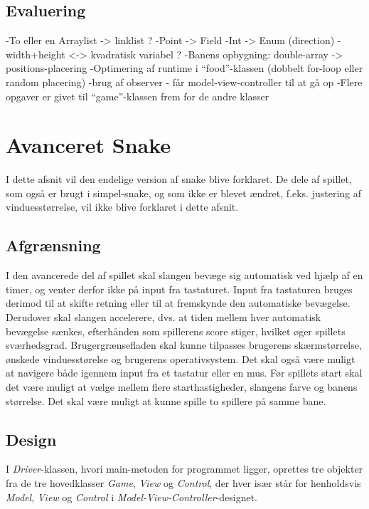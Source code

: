 \documentclass{report}
\begin{document}
\section{Evaluering}
-To eller en Arraylist -> linklist ?
-Point -> Field
-Int -> Enum (direction)
-width+height <-> kvadratisk variabel ?
-Banens opbygning: double-array -> positions-placering
-Optimering af runtime i “food”-klassen (dobbelt for-loop eller random placering)
-brug af observer - får model-view-controller til at gå op
-Flere opgaver er givet til “game”-klassen frem for de andre klasser

\chapter{Avanceret Snake}
I dette afsnit vil den endelige version af snake blive forklaret. De dele af spillet, som også er brugt i simpel-snake, og som ikke er blevet ændret, f.eks. justering af vinduesstørrelse, vil ikke blive forklaret i dette afsnit.

\section{Afgrænsning}
I den avancerede del af spillet skal slangen bevæge sig automatisk ved hjælp af en timer, og venter derfor ikke på input fra tastaturet. Input fra tastaturen bruges derimod til at skifte retning eller til at fremskynde den automatiske bevægelse. Derudover skal slangen accelerere, dvs. at tiden mellem hver automatisk bevægelse sænkes, efterhånden som spillerens score stiger, hvilket øger spillets sværhedsgrad. Brugergrænsefladen skal kunne tilpasses brugerens skærmstørrelse, ønskede vinduesstørelse og brugerens operativsystem. Det skal også være muligt at navigere både igennem input fra et tastatur eller en mus. Før spillets start skal det være muligt at vælge mellem flere starthastigheder, slangens farve og banens størrelse.
Det skal være muligt at kunne spille to spillere på samme bane.

\section{Design}
I \textit{Driver}-klassen, hvori main-metoden for programmet ligger, oprettes tre objekter fra de tre hovedklasser \textit{Game}, \textit{View} og \textit{Control}, der hver især står for henholdsvis \textit{Model}, \textit{View} og \textit{Control} i \textit{Model-View-Controller}-designet.
\end{document}
